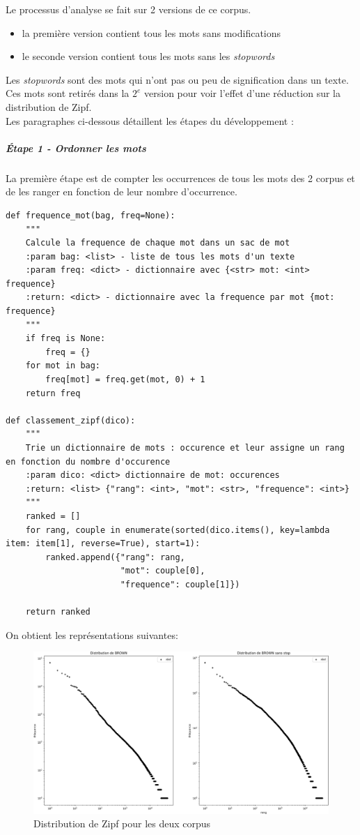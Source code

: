 \documentclass[a4paper,12pt]{article}
\begin{document}
		Le processus d'analyse se fait sur 2 versions de ce corpus.
		\begin{itemize}
			\item la première version contient tous les mots sans modifications
			\item le seconde version contient tous les mots sans les \emph{stopwords}
		\end{itemize}
		Les \emph{stopwords} sont des mots qui n'ont pas ou peu de signification dans un texte. Ces mots sont retirés dans la $2^e$ version pour voir l'effet d'une réduction sur la distribution de Zipf. \\
		
		Les paragraphes ci-dessous détaillent les étapes du développement :
		
		\subparagraph{Étape 1 - Ordonner les mots}
			La première étape est de compter les occurrences de tous les mots des 2 corpus et de les ranger en fonction de leur nombre d’occurrence. 
			\begin{lstlisting}[title=Triage des mots]
def frequence_mot(bag, freq=None):
    """
    Calcule la frequence de chaque mot dans un sac de mot
    :param bag: <list> - liste de tous les mots d'un texte
    :param freq: <dict> - dictionnaire avec {<str> mot: <int> frequence}
    :return: <dict> - dictionnaire avec la frequence par mot {mot: frequence}
    """
    if freq is None:
        freq = {}
    for mot in bag:
        freq[mot] = freq.get(mot, 0) + 1
    return freq
		
def classement_zipf(dico):
    """
    Trie un dictionnaire de mots : occurence et leur assigne un rang en fonction du nombre d'occurence
    :param dico: <dict> dictionnaire de mot: occurences
    :return: <list> {"rang": <int>, "mot": <str>, "frequence": <int>}
    """
    ranked = []
    for rang, couple in enumerate(sorted(dico.items(), key=lambda item: item[1], reverse=True), start=1):
        ranked.append({"rang": rang,
                       "mot": couple[0],
                       "frequence": couple[1]})

    return ranked \end{lstlisting}
    
    		
    		On obtient les représentations suivantes: 
		\begin{figure}[H]
				\includegraphics[width=\linewidth]{img/distribZipf.png}
				\caption{Distribution de Zipf pour les deux corpus}
		\end{figure}    		
    		
\end{document}
